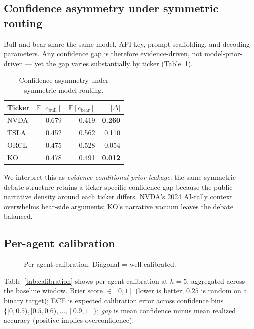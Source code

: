 \documentclass[conference]{IEEEtran}
\begin{document}
\subsection{Confidence asymmetry under symmetric routing}
\label{sec:results-asymmetry}

Bull and bear share the same model, API key, prompt scaffolding,
and decoding parameters. Any confidence gap is therefore
evidence-driven, not model-prior-driven --- yet the gap varies
substantially by ticker (Table~\ref{tab:asymmetry}).

\begin{table}[t]
\caption{Confidence asymmetry under symmetric model routing.}
\label{tab:asymmetry}
\centering\footnotesize
\begin{tabular}{lrrr}
\toprule
Ticker & $\mathbb{E}[c_{\text{bull}}]$ & $\mathbb{E}[c_{\text{bear}}]$ & $|\Delta|$ \\
\midrule
NVDA & 0.679 & 0.419 & \textbf{0.260} \\
TSLA & 0.452 & 0.562 & 0.110 \\
ORCL & 0.475 & 0.528 & 0.054 \\
KO   & 0.478 & 0.491 & \textbf{0.012} \\
\bottomrule
\end{tabular}
\end{table}

We interpret this as \emph{evidence-conditional prior leakage}: the
same symmetric debate structure retains a ticker-specific confidence
gap because the public narrative density around each ticker differs.
NVDA's 2024 AI-rally context overwhelms bear-side arguments; KO's
narrative vacuum leaves the debate balanced.

\subsection{Per-agent calibration}
\label{sec:results-calibration}

\begin{figure}[t]
  \centering
  \caption{Per-agent calibration. Diagonal = well-calibrated.}
  \label{fig:calibration}
\end{figure}

Table~\ref{tab:calibration} shows per-agent calibration at $h{=}5$,
aggregated across the baseline window. Brier score $\in[0,1]$
(lower is better; $0.25$ is random on a binary target); ECE is
expected calibration error across confidence bins
$\{[0,0.5), [0.5,0.6), \ldots, [0.9,1]\}$; \emph{gap} is mean
confidence minus mean realized accuracy (positive implies
overconfidence).
\end{document}
